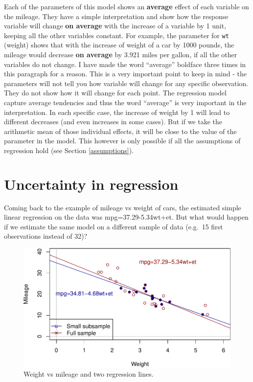 \documentclass[
]{book}
\theoremstyle{definition}
\theoremstyle{definition}
\theoremstyle{definition}
\theoremstyle{definition}
\theoremstyle{remark}
\begin{document}
Each of the parameters of this model shows an \textbf{average} effect of each variable on the mileage. They have a simple interpretation and show how the response variable will change \textbf{on average} with the increase of a variable by 1 unit, keeping all the other variables constant. For example, the parameter for \texttt{wt} (weight) shows that with the increase of weight of a car by 1000 pounds, the mileage would decrease \textbf{on average} by 3.921 miles per gallon, if all the other variables do not change. I have made the word ``average'' boldface three times in this paragraph for a reason. This is a very important point to keep in mind - the parameters will not tell you how variable will change for any specific observation. They do not show how it will change for each point. The regression model capture average tendencies and thus the word ``average'' is very important in the interpretation. In each specific case, the increase of weight by 1 will lead to different decreases (and even increases in some cases). But if we take the arithmetic mean of those individual effects, it will be close to the value of the parameter in the model. This however is only possible if all the assumptions of regression hold (see Section \ref{assumptions}).

\hypertarget{uncertaintyParameters}{%
\chapter{Uncertainty in regression}\label{uncertaintyParameters}}

Coming back to the example of mileage vs weight of cars, the estimated simple linear regression on the data was mpg=37.29-5.34wt+et. But what would happen if we estimate the same model on a different sample of data (e.g.~15 first observations instead of 32)?

\begin{figure}
\centering
\includegraphics{Svetunkov---Statistics-for-Business-Analytics_files/figure-latex/scatterWeightMPG4-1.pdf}
\caption{\label{fig:scatterWeightMPG4}Weight vs mileage and two regression lines.}
\end{figure}
\end{document}
